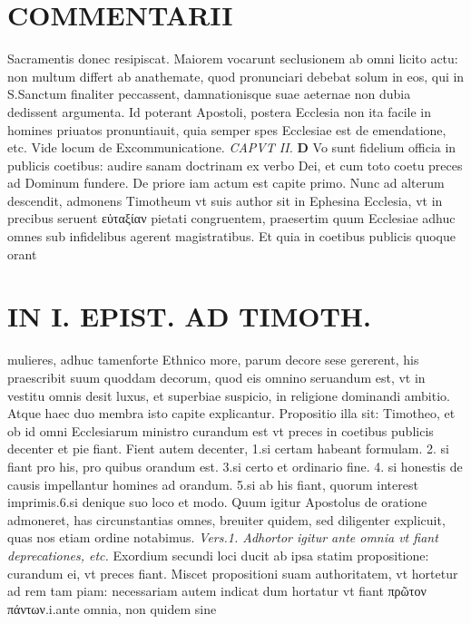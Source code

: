 \documentclass{article}
\begin{document}
\begin{pages}
\section*{COMMENTARII }
\marginpar{[ p.42 ]}\pstart Sacramentis donec resipiscat.  \pend\pstart Maiorem vocarunt seclusionem ab omni licito actu: non multum differt ab anathemate, quod pronunciari debebat solum in eos, qui in S.Sanctum finaliter peccassent, damnationisque suae aeternae non dubia dedissent argumenta. Id poterant Apostoli, postera Ecclesia non ita facile in homines priuatos pronuntiauit, quia semper spes Ecclesiae est de emendatione, etc. Vide locum de Excommunicatione.  \pend
\textit{CAPVT II. }
\textbf{D }\pstart Vo sunt fidelium officia in publicis coetibus: audire sanam doctrinam ex verbo Dei, et cum toto coetu preces ad Dominum fundere. De priore iam actum est capite primo. Nunc ad alterum descendit, admonens Timotheum vt suis author sit in Ephesina Ecclesia, vt in precibus seruent εὐταξίαν pietati congruentem, praesertim quum Ecclesiae adhuc omnes sub infidelibus agerent magistratibus.  \pend\pstart Et quia in coetibus publicis quoque orant  \pend
\section*{IN I. EPIST. AD TIMOTH. }
\marginpar{[ p.33 ]}\pstart mulieres, adhuc tamenforte Ethnico more, parum decore sese gererent, his praescribit suum quoddam decorum, quod eis omnino seruandum est, vt in vestitu omnis desit luxus, et superbiae suspicio, in religione dominandi ambitio. Atque haec duo membra isto capite explicantur.  \pend\pstart Propositio illa sit: Timotheo, et ob id omni Ecclesiarum ministro curandum est vt preces in coetibus publicis decenter et pie fiant. Fient autem decenter, 1.si certam habeant formulam. 2. si fiant pro his, pro quibus orandum est. 3.si certo et ordinario fine. 4. si honestis de causis impellantur homines ad orandum. 5.si ab his fiant, quorum interest imprimis.6.si denique suo loco et modo.  \pend\pstart Quum igitur Apostolus de oratione admoneret, has circunstantias omnes, breuiter quidem, sed diligenter explicuit, quas nos etiam ordine notabimus.  \pend
\textit{Vers.1. Adhortor igitur ante omnia vt fiant deprecationes, etc. }\pstart Exordium secundi loci ducit ab ipsa statim propositione: curandum ei, vt preces fiant. Miscet propositioni suam authoritatem, vt hortetur ad rem tam piam: necessariam autem indicat dum hortatur vt fiant πρῶτον πάντων.i.ante omnia, non quidem sine  \pend

\end{pages}
\end{document}
